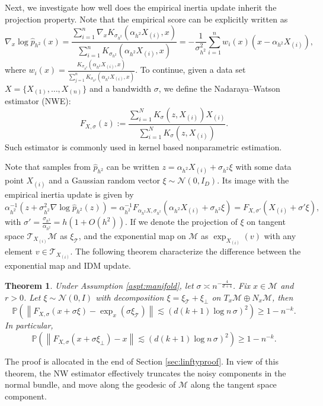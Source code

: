 \documentclass{article}
\newtheorem{thm}[theorem]{Theorem}
\def\phat{\hat{p}}
\def\calM{\mathcal{M}}
\begin{document}
Next, we investigate how well does the empirical inertia update inherit the projection property.  Note that the empirical score can be  explicitly written as 
\[
\nabla_x \log \phat_{h^2}(x)
=\frac{\sum_{i=1}^n \nabla_x K_{\sigma_{h^2}}(\alpha_{h^2}X_{(i)},x)}{\sum_{i=1}^n K_{\sigma_{h^2}}(\alpha_{h^2}X_{(i)},x)}
=-\frac{1}{\sigma_{h^2}^2} \sum_{i=1}^n w_i(x)\left(x-\alpha_{h^2} X_{(i)}\right),
\]
where $w_i(x)=\frac{K_{\sigma_{h^2}}(\alpha_{h^2}X_{(i)},x)}{\sum_{j=1}^n K_{\sigma_{h^2}}(\alpha_{h^2}X_{(i)},x)}$. To continue, given a data set $X=\{X_{(1)},\ldots,X_{(n)}\}$ and a bandwidth $\sigma$, we define the Nadaraya–Watson  estimator (NWE):
\begin{equation}
\label{eqn:NWE}
F_{X, \sigma}(z):= \frac{\sum\limits_{i=1}^N K_\sigma(z, X_{(i)}) X_{(i)}}{\sum\limits_{i=1}^N K_\sigma(z, X_{(i)})}.
\end{equation}
Such estimator is commonly used in kernel based nonparametric estimation.

Note that samples from $\phat_{h^2}$ can be written $z=\alpha_{h^2} X_{(i)}+\sigma_{h^2}\xi$ with some data point $X_{(i)}$ and a Gaussian random vector $\xi\sim \mathcal{N}(0,I_D)$. Its image with the empirical inertia update is given by 
\[
\alpha^{-1}_{h^2}(z+\sigma_{h^2}^2\nabla \log \phat_{h^2}(z))=\alpha^{-1}_{h^2} F_{\alpha_{h^2} X, \sigma_{h^2}}(\alpha_{h^2} X_{(i)}+\sigma_{h^2}\xi)=F_{X,\sigma'}(X_{(i)}+\sigma'\xi),
\]
with $\sigma'=\frac{\sigma_{h^2}}{\alpha_{h^2}}=h(1+O(h^2))$. 
If we denote the projection of $\xi$ on tangent space $\mathcal{T}_{X_{(i)}}\calM$ as $\xi_{\mathcal{T}}$, and the exponential map on $\calM$ as $\exp_{X_{(i)}}(v)$ with any element  $v\in \mathcal{T}_{X_{(i)}}$. The following theorem characterize the difference between the exponential map and IDM update. 
\begin{thm}
\label{thm:main2}
Under Assumption \ref{aspt:manifold}, let $\sigma\asymp n^{-\frac{4}{d+4}}$. Fix  $x\in \calM$ and $r>0$. Let $\xi\sim \mathcal{N}(0,I)$ with decomposition $\xi=\xi_{\mathcal{T}}+\xi_\bot$ on $T_x\calM\oplus N_x\calM$, then 
\begin{equation}
\label{eqn:NWproj2}
\mathbb{P}\left( \left\| F_{X,\sigma}(x + \sigma \xi) - \exp_x(\sigma \xi_{\mathcal{T}})\right\| \lesssim (d(k+1)\log n\, \sigma)^2\right) \ge 1 - n^{-k}.
\end{equation}
In particular, 
\begin{equation}
\label{eqn:NWproj2}
\mathbb{P}\left( \left\| F_{X,\sigma}(x + \sigma \xi_\bot) - x\right\| \lesssim (d(k+1)\log n\, \sigma)^2\right) \ge 1 - n^{-k}.
\end{equation}
\end{thm}
The proof is allocated in the end of Section \ref{sec:linftyproof}.
In view of this theorem, the NW estimator effectively truncates the noisy components in the normal bundle, and move along the geodesic of $\calM$ along the tangent space component. 
\end{document}
